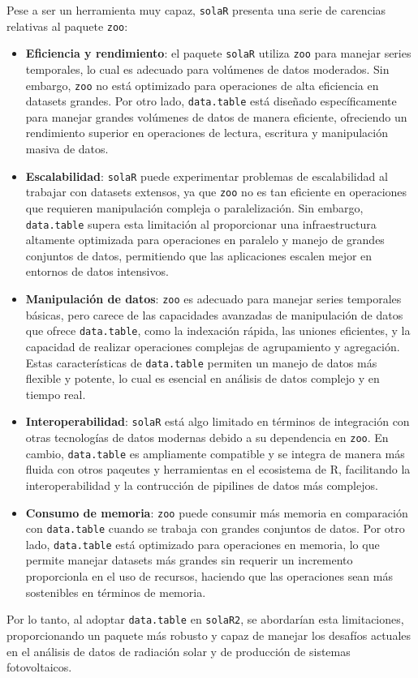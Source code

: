 Pese a ser un herramienta muy capaz, \texttt{solaR} presenta una serie de carencias relativas al paquete \texttt{zoo}:
\begin{itemize}
\item \textbf{Eficiencia y rendimiento}: el paquete \texttt{solaR} utiliza \texttt{zoo} para manejar series temporales, lo cual es adecuado para volúmenes de datos moderados. Sin embargo, \texttt{zoo} no está optimizado para operaciones de alta eficiencia en datasets grandes. Por otro lado, \texttt{data.table} está diseñado específicamente para manejar grandes volúmenes de datos de manera eficiente, ofreciendo un rendimiento superior en operaciones de lectura, escritura y manipulación masiva de datos.
\item \textbf{Escalabilidad}: \texttt{solaR} puede experimentar problemas de escalabilidad al trabajar con datasets extensos, ya que \texttt{zoo} no es tan eficiente en operaciones que requieren manipulación compleja o paralelización. Sin embargo, \texttt{data.table} supera esta limitación al proporcionar una infraestructura altamente optimizada para operaciones en paralelo y manejo de grandes conjuntos de datos, permitiendo que las aplicaciones escalen mejor en entornos de datos intensivos.
\item \textbf{Manipulación de datos}: \texttt{zoo} es adecuado para manejar series temporales básicas, pero carece de las capacidades avanzadas de manipulación de datos que ofrece \texttt{data.table}, como la indexación rápida, las uniones eficientes, y la capacidad de realizar operaciones complejas de agrupamiento y agregación. Estas características de \texttt{data.table} permiten un manejo de datos más flexible y potente, lo cual es esencial en análisis de datos complejo y en tiempo real.
\item \textbf{Interoperabilidad}: \texttt{solaR} está algo limitado en términos de integración con otras tecnologías de datos modernas debido a su dependencia en \texttt{zoo}. En cambio, \texttt{data.table} es ampliamente compatible y se integra de manera más fluida con otros paqeutes y herramientas en el ecosistema de R, facilitando la interoperabilidad y la contrucción de pipilines de datos más complejos.
\item \textbf{Consumo de memoria}: \texttt{zoo} puede consumir más memoria en comparación con \texttt{data.table} cuando se trabaja con grandes conjuntos de datos. Por otro lado, \texttt{data.table} está optimizado para operaciones en memoria, lo que permite manejar datasets más grandes sin requerir un incremento proporcionla en el uso de recursos, haciendo que las operaciones sean más sostenibles en términos de memoria.
\end{itemize}

Por lo tanto, al adoptar \texttt{data.table} en \texttt{solaR2}, se abordarían esta limitaciones, proporcionando un paquete más robusto y capaz de manejar los desafíos actuales en el análisis de datos de radiación solar y de producción de sistemas fotovoltaicos.
